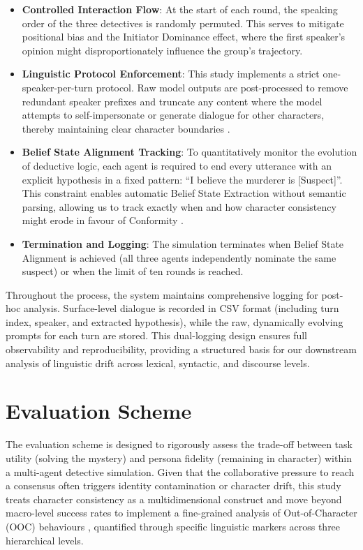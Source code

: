 \documentclass{article}
\begin{document}
\begin{itemize}
    \item \textbf{Controlled Interaction Flow}: At the start of each round, the speaking order of the three detectives is randomly permuted. This serves to mitigate positional bias and the Initiator Dominance effect, where the first speaker’s opinion might disproportionately influence the group’s trajectory.
    \item \textbf{Linguistic Protocol Enforcement}: This study implements a strict one-speaker-per-turn protocol. Raw model outputs are post-processed to remove redundant speaker prefixes and truncate any content where the model attempts to self-impersonate or generate dialogue for other characters, thereby maintaining clear character boundaries \citep{chen2024review}.
    \item \textbf{Belief State Alignment Tracking}: To quantitatively monitor the evolution of deductive logic, each agent is required to end every utterance with an explicit hypothesis in a fixed pattern: “I believe the murderer is [Suspect]”. This constraint enables automatic Belief State Extraction without semantic parsing, allowing us to track exactly when and how character consistency might erode in favour of Conformity \citep{baltaji2024cultured}.
    \item \textbf{Termination and Logging}: The simulation terminates when Belief State Alignment is achieved (all three agents independently nominate the same suspect) or when the limit of ten rounds is reached.
\end{itemize}

Throughout the process, the system maintains comprehensive logging for post-hoc analysis. Surface-level dialogue is recorded in CSV format (including turn index, speaker, and extracted hypothesis), while the raw, dynamically evolving prompts for each turn are stored. This dual-logging design ensures full observability and reproducibility, providing a structured basis for our downstream analysis of linguistic drift across lexical, syntactic, and discourse levels.


\section{Evaluation Scheme}

The evaluation scheme is designed to rigorously assess the trade-off between task utility (solving the mystery) and persona fidelity (remaining in character) within a multi-agent detective simulation. Given that the collaborative pressure to reach a consensus often triggers identity contamination or character drift, this study treats character consistency as a multidimensional construct and move beyond macro-level success rates to implement a fine-grained analysis of Out-of-Character (OOC) behaviours \citep{zhou2023characterglm}, quantified through specific linguistic markers across three hierarchical levels.
\end{document}
